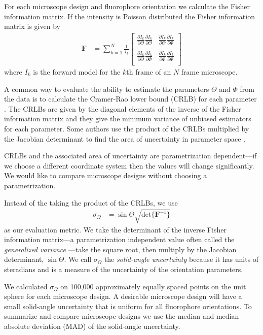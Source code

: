 \documentclass[10pt]{article}
\providecommand{\mb}[1]{\mathbf{#1}}
\begin{document}
For each microscope design and fluorophore orientation we calculate the Fisher
information matrix. If the intensity is Poisson distributed the
Fisher information matrix is given by
\begin{align}
  \mb{F} &= \sum_{k=1}^N \frac{1}{I_k}
  \begin{bmatrix}
    \frac{\partial I_k}{\partial \Theta}\frac{\partial I_k}{\partial \Theta}&\frac{\partial I_k}{\partial \Theta}\frac{\partial I_k}{\partial \Phi}\\\\
    \frac{\partial I_k}{\partial \Theta}\frac{\partial I_k}{\partial \Phi}&\frac{\partial I_k}{\partial \Phi}\frac{\partial I_k}{\partial \Phi}\\    
  \end{bmatrix}
\end{align}
where $I_k$ is the forward model for the $k$th frame of an $N$ frame microscope. 

A common way to evaluate the ability to estimate the parameters $\Theta$ and
$\Phi$ from the data is to calculate the Cramer-Rao lower bound (CRLB) for each
parameter \cite{kay1993}. The CRLBs are given by the diagonal elements of the
inverse of the Fisher information matrix and they give the minimum variance of
unbiased estimators for each parameter. Some authors use the product of the
CRLBs multiplied by the Jacobian determinant to find the area of uncertainty in
parameter space \cite{agrawal2012}.

CRLBs and the associated area of uncertainty are parametrization dependent---if
we choose a different coordinate system then the values will change
significantly. We would like to compare microscope designs without choosing a
parametrization.

Instead of the taking the product of the CRLBs, we use
\begin{align}
  \sigma_{\Omega} &= \sin\Theta\sqrt{\text{det}\{\mb{F}^{-1}\}}
\end{align}
as our evaluation metric. We take the determinant of the inverse Fisher
information matrix---a parametrization independent value often called the
\emph{generalized variance} \cite{anderson1958}---take the square root, then
multiply by the Jacobian determinant, $\sin\Theta$. We call $\sigma_{\Omega}$ the
\emph{solid-angle uncertainty} because it has units of steradians and is a
measure of the uncertainty of the orientation parameters.

We calculated $\sigma_{\Omega}$ on 100,000 approximately equally spaced points
on the unit sphere for each microscope design. A desirable microscope design
will have a small solid-angle uncertainty that is uniform for all fluorophore
orientations. To summarize and compare microscope designs we use the median and
median absolute deviation (MAD) of the solid-angle uncertainty.
\end{document}
